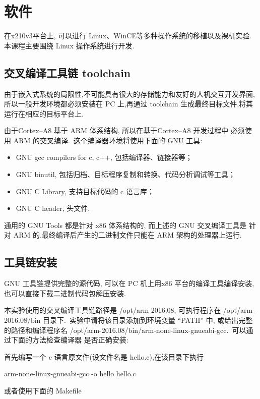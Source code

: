 \section{软件}

	在x210v3平台上, 可以进行 Linux、WinCE等多种操作系统的移植以及裸机实验.
本课程主要围绕 Linux 操作系统进行开发.

\subsection{交叉编译工具链 toolchain}
	由于嵌入式系统的局限性,不可能具有很大的存储能力和友好的人机交互开发界面,
所以一般开发环境都必须安装在 PC 上,再通过 toolchain 生成最终目标文件,将其
运行在相应的目标平台上.

	由于Cortex--A8 基于 ARM 体系结构, 所以在基于Cortex--A8 开发过程中
必须使用 ARM 的交叉编译.~这个编译器环境将使用下面的 GNU 工具:
\begin{itemize}\itemsep=-3pt
  \item GNU gcc compilers for c, c++, 包括编译器、链接器等；
  \item GNU binutil, 包括归档、目标程序复制和转换、代码分析调试等工具；
  \item GNU C Library, 支持目标代码的 c 语言库；
  \item GNU C header, 头文件.
\end{itemize}
	通用的 GNU Tools 都是针对 x86 体系结构的, 而上述的 GNU 交叉编译工具是
针对 ARM 的.最终编译后产生的二进制文件只能在 ARM 架构的处理器上运行.

\subsection{工具链安装}
	GNU 工具链提供完整的源代码, 可以在 PC 机上用x86 平台的编译工具编译安装,
也可以直接下载二进制代码包解压安装.

	本实验使用的交叉编译工具链路径是 /opt/arm-2016.08, 可执行程序在
 /opt/arm-2016.08/bin 目录下.~实验中请将该目录添加到环境变量 ``PATH''
中, 或给出完整的路径和编译程序名
/opt/arm-2016.08/bin/arm-none-linux-gnueabi-gcc.~可以通过下面的方法检查编译器
是否正确安装:

    首先编写一个 c 语言原文件(设文件名是 hello.c),在该目录下执行

    arm-none-linux-gnueabi-gcc -o hello hello.c

    或者使用下面的 Makefile

\lstset{language=make}
\lstset{frameround=ftft}

